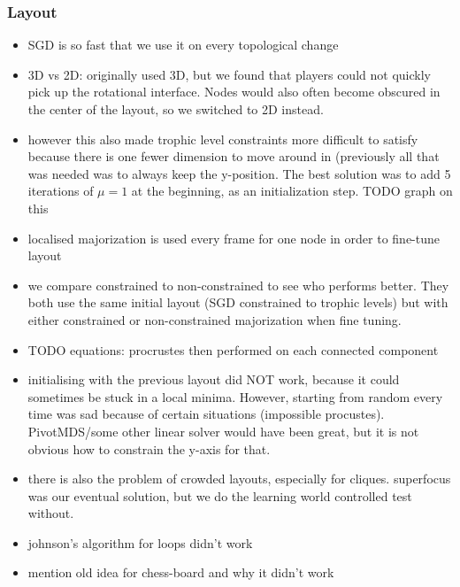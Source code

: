 \subsubsection{Layout}
\begin{itemize}
  \item SGD is so fast that we use it on every topological change
  \item 3D vs 2D: originally used 3D, but we found that players could not quickly pick up the rotational interface. Nodes would also often become obscured in the center of the layout, so we switched to 2D instead. 
  \item however this also made trophic level constraints more difficult to satisfy because there is one fewer dimension to move around in (previously all that was needed was to always keep the y-position. The best solution was to add 5 iterations of $\mu=1$ at the beginning, as an initialization step. TODO graph on this
  \item localised majorization is used every frame for one node in order to fine-tune layout
  \item we compare constrained to non-constrained to see who performs better. They both use the same initial layout (SGD constrained to trophic levels) but with either constrained or non-constrained majorization when fine tuning.
  \item TODO equations: procrustes then performed on each connected component
  \item initialising with the previous layout did NOT work, because it could sometimes be stuck in a local minima. However, starting from random every time was sad because of certain situations (impossible procustes). PivotMDS/some other linear solver would have been great, but it is not obvious how to constrain the y-axis for that.
  \item there is also the problem of crowded layouts, especially for cliques. superfocus was our eventual solution, but we do the learning world controlled test without.
  \item johnson's algorithm for loops didn't work
  \item mention old idea for chess-board and why it didn't work
\end{itemize}

